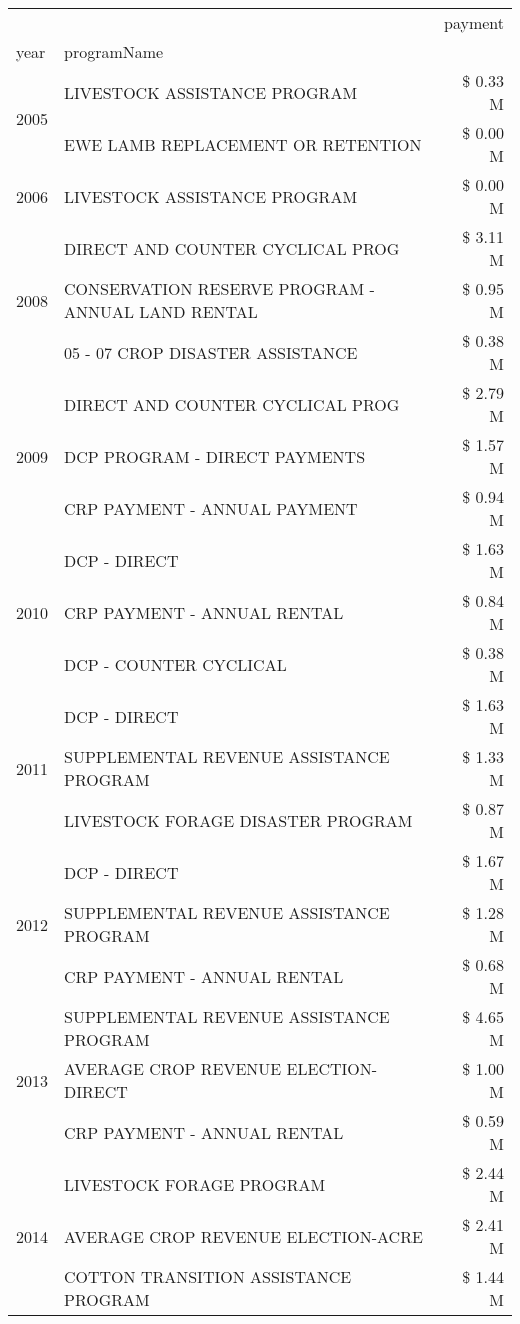 \begin{tabular}{llr}
\toprule
 &  & payment \\
year & programName &  \\
\midrule
\multirow[t]{2}{*}{2005} & LIVESTOCK ASSISTANCE PROGRAM & \$ 0.33 M \\
 & EWE LAMB REPLACEMENT OR RETENTION & \$ 0.00 M \\
\cline{1-3}
2006 & LIVESTOCK ASSISTANCE PROGRAM & \$ 0.00 M \\
\cline{1-3}
\multirow[t]{3}{*}{2008} & DIRECT AND COUNTER CYCLICAL PROG & \$ 3.11 M \\
 & CONSERVATION RESERVE PROGRAM - ANNUAL LAND RENTAL & \$ 0.95 M \\
 & 05 - 07 CROP DISASTER ASSISTANCE & \$ 0.38 M \\
\cline{1-3}
\multirow[t]{3}{*}{2009} & DIRECT AND COUNTER CYCLICAL PROG & \$ 2.79 M \\
 & DCP PROGRAM - DIRECT PAYMENTS & \$ 1.57 M \\
 & CRP PAYMENT - ANNUAL PAYMENT & \$ 0.94 M \\
\cline{1-3}
\multirow[t]{3}{*}{2010} & DCP - DIRECT & \$ 1.63 M \\
 & CRP PAYMENT - ANNUAL RENTAL & \$ 0.84 M \\
 & DCP - COUNTER CYCLICAL & \$ 0.38 M \\
\cline{1-3}
\multirow[t]{3}{*}{2011} & DCP - DIRECT & \$ 1.63 M \\
 & SUPPLEMENTAL REVENUE ASSISTANCE PROGRAM & \$ 1.33 M \\
 & LIVESTOCK FORAGE DISASTER PROGRAM & \$ 0.87 M \\
\cline{1-3}
\multirow[t]{3}{*}{2012} & DCP - DIRECT & \$ 1.67 M \\
 & SUPPLEMENTAL REVENUE ASSISTANCE PROGRAM & \$ 1.28 M \\
 & CRP PAYMENT - ANNUAL RENTAL & \$ 0.68 M \\
\cline{1-3}
\multirow[t]{3}{*}{2013} & SUPPLEMENTAL REVENUE ASSISTANCE PROGRAM & \$ 4.65 M \\
 & AVERAGE CROP REVENUE ELECTION-DIRECT & \$ 1.00 M \\
 & CRP PAYMENT - ANNUAL RENTAL & \$ 0.59 M \\
\cline{1-3}
\multirow[t]{3}{*}{2014} & LIVESTOCK FORAGE PROGRAM & \$ 2.44 M \\
 & AVERAGE CROP REVENUE ELECTION-ACRE & \$ 2.41 M \\
 & COTTON TRANSITION ASSISTANCE PROGRAM & \$ 1.44 M \\

\end{tabular}
